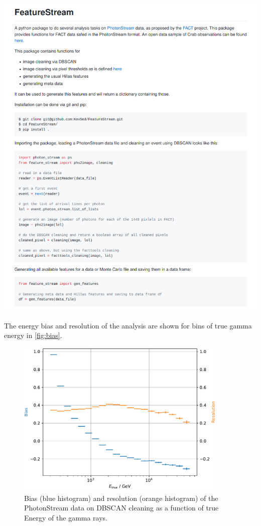 %
\includegraphics[width=1.2\textwidth]{Plots/feature_stream_readme.png}

%
The energy bias and resolution of the analysis are shown for bins of true gamma
energy in \autoref{fig:bias}.
%
\begin{figure}
  \centering
  \includegraphics[width=0.9\textwidth]{Plots/results/DBSCAN/bias_resolution.pdf}
  \caption{Bias (blue histogram) and resolution (orange histogram) of the PhotonStream data on DBSCAN cleaning as a function of true Energy of the gamma rays.}
  \label{fig:bias}
\end{figure}
%

